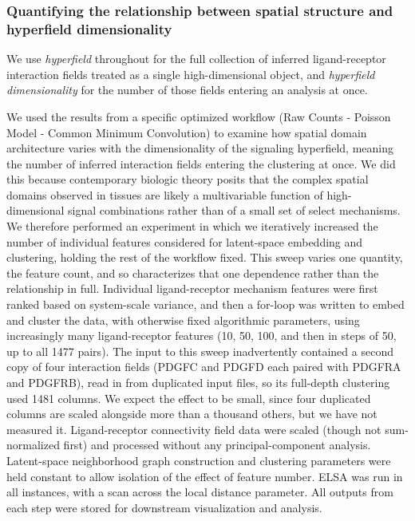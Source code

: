 \documentclass[10pt,letterpaper]{article}
\begin{document}
\subsubsection*{Quantifying the relationship between spatial structure and hyperfield dimensionality}

We use \textit{hyperfield} throughout for the full collection of inferred ligand-receptor interaction fields treated as a single high-dimensional object, and \textit{hyperfield dimensionality} for the number of those fields entering an analysis at once.

We used the results from a specific optimized workflow (Raw Counts - Poisson Model - Common Minimum Convolution) to examine how spatial domain architecture varies with the dimensionality of the signaling hyperfield, meaning the number of inferred interaction fields entering the clustering at once. We did this because contemporary biologic theory posits that the complex spatial domains observed in tissues are likely a multivariable function of high-dimensional signal combinations rather than of a small set of select mechanisms. We therefore performed an experiment in which we iteratively increased the number of individual features considered for latent-space embedding and clustering, holding the rest of the workflow fixed. This sweep varies one quantity, the feature count, and so characterizes that one dependence rather than the relationship in full. Individual ligand-receptor mechanism features were first ranked based on system-scale variance, and then a for-loop was written to embed and cluster the data, with otherwise fixed algorithmic parameters, using increasingly many ligand-receptor features (10, 50, 100, and then in steps of 50, up to all 1477 pairs). The input to this sweep inadvertently contained a second copy of four interaction fields (PDGFC and PDGFD each paired with PDGFRA and PDGFRB), read in from duplicated input files, so its full-depth clustering used 1481 columns. We expect the effect to be small, since four duplicated columns are scaled alongside more than a thousand others, but we have not measured it. Ligand-receptor connectivity field data were scaled (though not sum-normalized first) and processed without any principal-component analysis. Latent-space neighborhood graph construction and clustering parameters were held constant to allow isolation of the effect of feature number. ELSA was run in all instances, with a scan across the local distance parameter. All outputs from each step were stored for downstream visualization and analysis.
\end{document}
